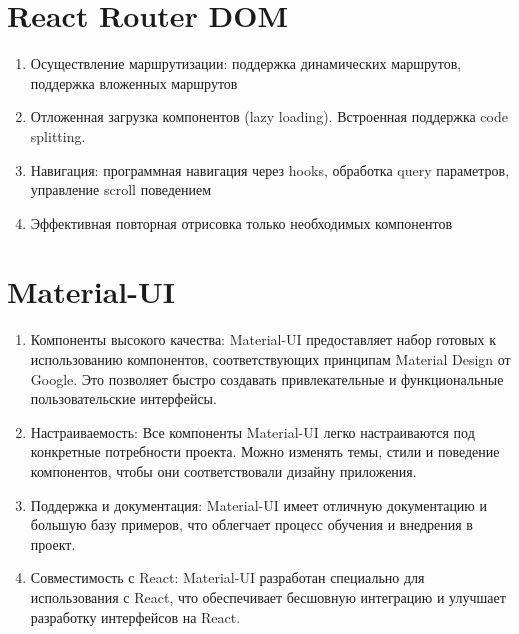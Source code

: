 \section{React Router DOM}\label{sec:---reactrouter}

\begin{enumerate}
    \item Осуществление маршрутизации: поддержка динамических маршрутов, поддержка вложенных маршрутов

    \item Отложенная загрузка компонентов (lazy loading).
    Встроенная поддержка code splitting.

    \item Навигация: программная навигация через hooks, обработка query параметров, управление scroll поведением

    \item Эффективная повторная отрисовка только необходимых компонентов
\end{enumerate}


\section{Material-UI}\label{sec:---mui}

\begin{enumerate}
    \item Компоненты высокого качества: Material-UI предоставляет набор готовых к использованию компонентов, соответствующих принципам Material Design от Google.
    Это позволяет быстро создавать привлекательные и функциональные пользовательские интерфейсы.

    \item Настраиваемость: Все компоненты Material-UI легко настраиваются под конкретные потребности проекта.
    Можно изменять темы, стили и поведение компонентов, чтобы они соответствовали дизайну приложения.

    \item Поддержка и документация: Material-UI имеет отличную документацию и большую базу примеров, что облегчает процесс обучения и внедрения в проект.

    \item Совместимость с React: Material-UI разработан специально для использования с React, что обеспечивает бесшовную интеграцию и улучшает разработку интерфейсов на React.

\end{enumerate}


